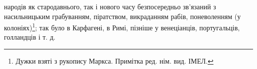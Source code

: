 народів як стародавнього, так і нового часу безпосередньо зв’язаний
з насильницьким грабуванням, піратством, викраданням рабів,
поневоленням (у колоніях)\footnote*{
Дужки взяті з рукопису Маркса. Примітка ред. нім. вид. ІМЕЛ.
}; так було в Карфагені, в Римі,
пізніше у венеціанців, португальців, голландців і т. д.
